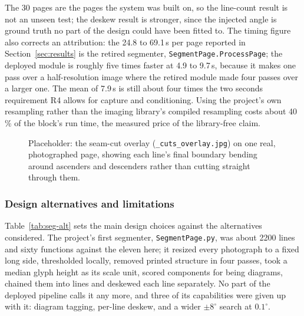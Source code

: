 The 30 pages are the pages the system was built on, so the line-count result is not an unseen test; the deskew result is stronger, since the injected angle is ground truth no part of the design could have been fitted to. The timing figure also corrects an attribution: the 24.8 to 69.1\,s per page reported in Section~\ref{sec:results} is the retired segmenter, \texttt{SegmentPage.ProcessPage}; the deployed module is roughly five times faster at 4.9 to 9.7\,s, because it makes one pass over a half-resolution image where the retired module made four passes over a larger one. The mean of 7.9\,s is still about four times the two seconds requirement R4 allows for capture and conditioning. Using the project's own resampling rather than the imaging library's compiled resampling costs about 40\,\% of the block's run time, the measured price of the library-free claim.

\begin{figure}[htb]
\centering
{}
\captionsetup{singlelinecheck=false,justification=justified}
\caption{Placeholder: the seam-cut overlay (\texttt{\_cuts\_overlay.jpg}) on one real, photographed page, showing each line's final boundary bending around ascenders and descenders rather than cutting straight through them.}
\label{fig:seg-cuts}
\end{figure}

\subsubsection{Design alternatives and limitations}

Table~\ref{tab:seg-alt} sets the main design choices against the alternatives considered. The project's first segmenter, \texttt{SegmentPage.py}, was about 2200 lines and sixty functions against the eleven here; it resized every photograph to a fixed long side, thresholded locally, removed printed structure in four passes, took a median glyph height as its scale unit, scored components for being diagrams, chained them into lines and deskewed each line separately. No part of the deployed pipeline calls it any more, and three of its capabilities were given up with it: diagram tagging, per-line deskew, and a wider $\pm8^\circ$ search at $0.1^\circ$.

